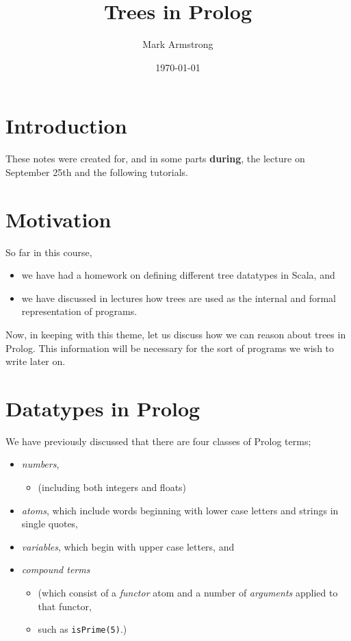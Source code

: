 \documentclass[11pt]{article}
\author{Mark Armstrong}
\date{\today}
\title{Trees in Prolog}
\begin{document}
\maketitle
\tableofcontents


\section{Introduction}
\label{sec:org8b42669}
These notes were created for, and in some parts \textbf{during},
the lecture on September 25th and the following tutorials.

\section{Motivation}
\label{sec:orgf121fd5}
So far in this course,
\begin{itemize}
\item we have had a homework on defining different tree datatypes
in Scala, and
\item we have discussed in lectures how trees are used
as the internal and formal representation of programs.
\end{itemize}

Now, in keeping with this theme, let us discuss
how we can reason about trees in Prolog.
This information will be necessary for the sort of programs
we wish to write later on.

\section{Datatypes in Prolog}
\label{sec:org4f20145}
We have previously discussed that there are
four classes of Prolog terms;
\begin{itemize}
\item \emph{numbers},
\begin{itemize}
\item (including both integers and floats)
\end{itemize}
\item \emph{atoms}, which include
words beginning with lower case letters
and strings in single quotes,
\item \emph{variables}, which begin with upper case letters, and
\item \emph{compound terms}
\begin{itemize}
\item (which consist of a \emph{functor} atom and a number
of \emph{arguments} applied to that functor,
\item such as \texttt{isPrime(5)}.)
\end{itemize}
\end{itemize}
\end{document}
